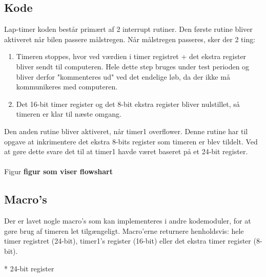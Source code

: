 \subsection{Kode}
Lap-timer koden består primært af 2 interrupt rutiner. Den første rutine bliver aktiveret når bilen passere målstregen. Når målstregen passeres, sker der 2 ting: 

\begin{enumerate}
\item Timeren stoppes, hvor ved værdien i timer registret + det ekstra register bliver sendt til computeren. Hele dette step bruges under test perioden og bliver derfor "kommenteres ud" ved det endelige løb, da der ikke må kommunikeres med computeren.  
\item Det 16-bit timer register og det 8-bit ekstra register bliver nulstillet, så timeren er klar til næste omgang.
\end{enumerate}
Den anden rutine bliver aktiveret, når timer1 overflower. Denne rutine har til opgave at inkrimentere det ekstra 8-bits register som timeren er blev tildelt. Ved at gøre dette svare det til at timer1 havde været baseret på et 24-bit register.\\
\\
Figur \textbf{figur som viser flowshart}
\subsection{Macro's}
Der er lavet nogle macro's som kan implementeres i andre kodemoduler, for at gøre brug af timeren let tilgængeligt. Macro'erne returnere henholdsvis: hele timer registret (24-bit), timer1's register (16-bit) eller det ekstra timer register (8-bit). 

	
* 24-bit register\\
